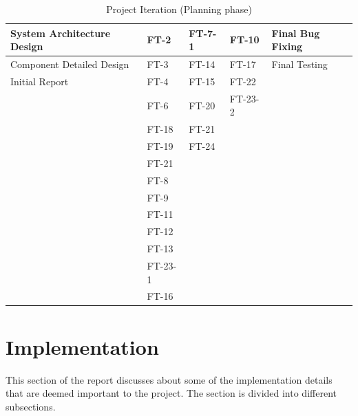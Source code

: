 \documentclass[11pt]{article}
\begin{document}
\begin{center}
\begin{table}[!htb]
\begin{tabular}{|m{3cm}|m{2cm}|m{2cm}|m{2cm}|m{3cm}|}
		System Architecture Design & FT-2 & FT-7-1 & FT-10 & Final Bug Fixing\\ \hline
		
		Component Detailed Design & FT-3 & FT-14 & FT-17 & Final Testing\\ \hline
		
		Initial Report & FT-4 & FT-15 & FT-22 & \\ \hline
		
		& FT-6 & FT-20 & FT-23-2 & \\ \hline
		
		& FT-18 & FT-21 && \\ \hline
		
		& FT-19 & FT-24 & &\\ \hline
		& FT-21 &&&\\ \hline
		& FT-8 &&& \\ \hline
		& FT-9 &&& \\ \hline
		& FT-11 &&& \\ \hline
		& FT-12 &&& \\ \hline
		& FT-13 &&& \\ \hline
		& FT-23-1 &&& \\ \hline
		& FT-16 &&&\\ \hline
		\end{tabular}
		\caption{Project Iteration (Planning phase)}
		\label{table:iteration} 
		\end{table}
\end{center}
 
	
\section{Implementation} 

This section of the report discusses about some of the implementation details that are deemed important to the project. The section is divided into different subsections.
\end{document}
